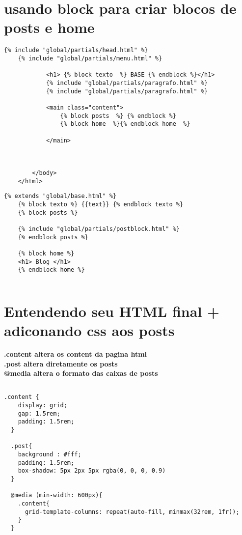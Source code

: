 \documentclass{article}
\begin{document}
\section{usando block para criar blocos de posts e home }
\begin{lstlisting}[style=htmlStyle, caption={base/global/base.html}]
    {% include "global/partials/head.html" %}
    {% include "global/partials/menu.html" %}
    
            <h1> {% block texto  %} BASE {% endblock %}</h1>
            {% include "global/partials/paragrafo.html" %}
            {% include "global/partials/paragrafo.html" %}
    
            <main class="content">
                {% block posts  %} {% endblock %}
                {% block home  %}{% endblock home  %}
                
            </main>
            
            
            
        </body>
    </html>
\end{lstlisting}

\begin{lstlisting}[style=htmlStyle, caption={blog/templates/blog/blog.html}]
    {% extends "global/base.html" %}
    {% block texto %} {{text}} {% endblock texto %}
    {% block posts %}
    
    {% include "global/partials/postblock.html" %}
    {% endblock posts %}
    
    {% block home %}
    <h1> Blog </h1>
    {% endblock home %}
    
\end{lstlisting}

\section{Entendendo seu HTML final + adiconando css aos posts}
\textbf{.content altera os content da pagina html\\}
\textbf{.post altera diretamente os posts\\}
\textbf{@media altera o formato das caixas de posts}
\begin{lstlisting}[style=cssStyle, caption={base/static/global/css/style.css}]
    
.content {
    display: grid;
    gap: 1.5rem;
    padding: 1.5rem;
  }
  
  .post{
    background : #fff;
    padding: 1.5rem;
    box-shadow: 5px 2px 5px rgba(0, 0, 0, 0.9)
  }
  
  @media (min-width: 600px){
    .content{
      grid-template-columns: repeat(auto-fill, minmax(32rem, 1fr));
    }
  }
  
\end{lstlisting}
\end{document}
